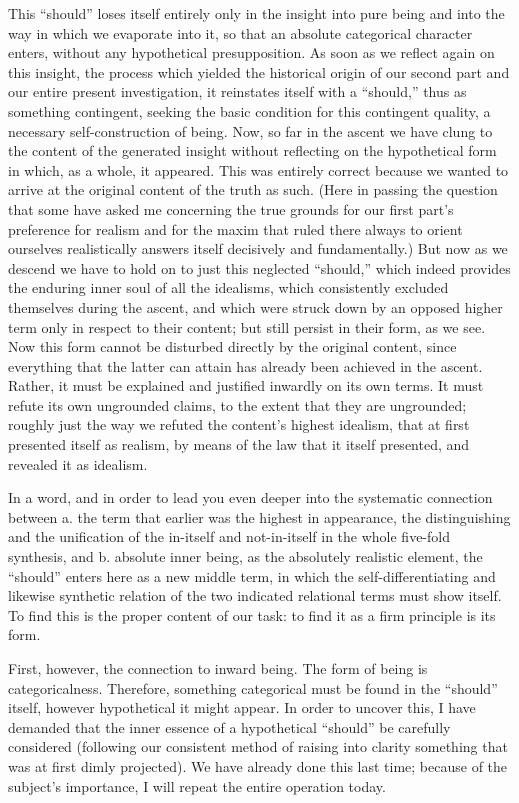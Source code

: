 This “should” loses itself entirely
only in the insight into pure being
and into the way in which we evaporate into it,
so that an absolute categorical character enters,
without any hypothetical presupposition.
As soon as we reflect again on this insight,
the process which yielded the historical origin
of our second part and our entire present investigation,
it reinstates itself with a “should,”
thus as something contingent,
seeking the basic condition for this contingent quality,
a necessary self-construction of being.
Now, so far in the ascent we have clung to
the content of the generated insight without reflecting
on the hypothetical form in which, as a whole, it appeared.
This was entirely correct because we wanted to arrive
at the original content of the truth as such.
(Here in passing the question that some have asked me concerning
the true grounds for our first part's preference for realism and
for the maxim that ruled there always to orient ourselves realistically
answers itself decisively and fundamentally.)
But now as we descend we have to hold on
to just this neglected “should,”
which indeed provides the enduring
inner soul of all the idealisms,
which consistently excluded themselves during the ascent,
and which were struck down by an opposed higher term
only in respect to their content;
but still persist in their form, as we see.
Now this form cannot be disturbed
directly by the original content,
since everything that the latter can attain
has already been achieved in the ascent.
Rather, it must be explained
and justified inwardly on its own terms.
It must refute its own ungrounded claims,
to the extent that they are ungrounded;
roughly just the way we refuted
the content's highest idealism,
that at first presented itself as realism,
by means of the law that it itself presented,
and revealed it as idealism.

In a word, and in order to lead you
even deeper into the systematic connection between
a. the term that earlier was the highest in appearance,
the distinguishing and the unification of
the in-itself and not-in-itself
in the whole five-fold synthesis, and
b. absolute inner being,
as the absolutely realistic element,
the “should” enters here as a new middle term,
in which the self-differentiating
and likewise synthetic relation
of the two indicated relational terms must show itself.
To find this is the proper content of our task:
to find it as a firm principle is its form.

First, however, the connection to inward being.
The form of being is categoricalness.
Therefore, something categorical must be found
in the “should” itself,
however hypothetical it might appear.
In order to uncover this,
I have demanded that the inner essence
of a hypothetical “should” be carefully considered
(following our consistent method of raising into clarity
something that was at first dimly projected).
We have already done this last time;
because of the subject's importance,
I will repeat the entire operation today.

